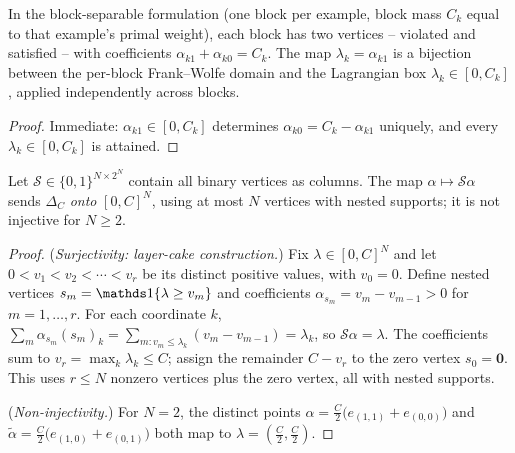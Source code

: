 \begin{lemma}
\label{lem:block_bijection}
In the block-separable formulation (one block per example, block mass $C_k$
equal to that example's primal weight), each block has two vertices --
violated and satisfied -- with coefficients $\alpha_{k1} + \alpha_{k0} = C_k$.
The map $\lambda_k = \alpha_{k1}$ is a bijection between the per-block
Frank--Wolfe domain and the Lagrangian box $\lambda_k \in [0, C_k]$, applied
independently across blocks.
\end{lemma}

\begin{proof}
Immediate: $\alpha_{k1} \in [0, C_k]$ determines $\alpha_{k0} = C_k -
\alpha_{k1}$ uniquely, and every $\lambda_k \in [0, C_k]$ is attained.
\end{proof}

\begin{lemma}
\label{lem:holistic_surjection}
Let $\mathcal{S} \in \{0,1\}^{N \times 2^N}$ contain all binary vertices as
columns. The map $\alpha \mapsto \mathcal{S}\alpha$ sends $\Delta_C$
\emph{onto} $[0, C]^N$, using at most $N$ vertices with nested supports; it is
not injective for $N \ge 2$.
\end{lemma}

\begin{proof}
(\emph{Surjectivity: layer-cake construction.}) Fix $\lambda \in [0,C]^N$ and
let $0 < v_1 < v_2 < \cdots < v_r$ be its distinct positive values, with
$v_0 = 0$. Define nested vertices $s_m = \mathbbm{1}\{\lambda \ge v_m\}$ and
coefficients $\alpha_{s_m} = v_m - v_{m-1} > 0$ for $m = 1, \dots, r$. For each
coordinate $k$, $\sum_m \alpha_{s_m} (s_m)_k = \sum_{m : v_m \le \lambda_k}
(v_m - v_{m-1}) = \lambda_k$, so $\mathcal{S}\alpha = \lambda$. The
coefficients sum to $v_r = \max_k \lambda_k \le C$; assign the remainder
$C - v_r$ to the zero vertex $s_0 = \mathbf{0}$. This uses $r \le N$ nonzero
vertices plus the zero vertex, all with nested supports.

(\emph{Non-injectivity.}) For $N = 2$, the distinct points
$\alpha = \tfrac{C}{2}\bigl(e_{(1,1)} + e_{(0,0)}\bigr)$ and
$\widetilde{\alpha} = \tfrac{C}{2}\bigl(e_{(1,0)} + e_{(0,1)}\bigr)$
both map to $\lambda = (\tfrac{C}{2}, \tfrac{C}{2})$.
\end{proof}

